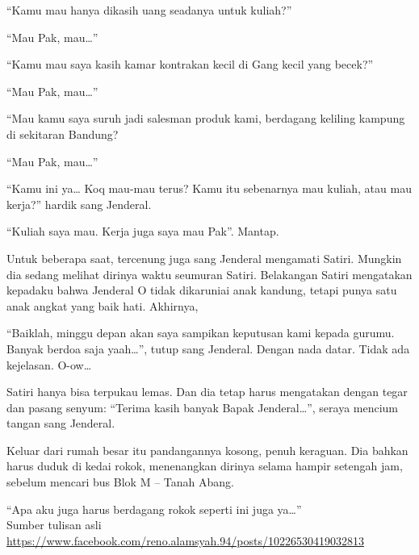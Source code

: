 “Kamu mau hanya dikasih uang seadanya untuk kuliah?”

“Mau Pak, mau…”

“Kamu mau saya kasih kamar kontrakan kecil di Gang kecil yang becek?”

“Mau Pak, mau…”

“Mau kamu saya suruh jadi salesman produk kami, berdagang keliling kampung di sekitaran Bandung?

“Mau Pak, mau…”

“Kamu ini ya… Koq mau-mau terus? Kamu itu sebenarnya mau kuliah, atau mau kerja?” hardik sang Jenderal.

“Kuliah saya mau. Kerja juga saya mau Pak”. Mantap.

Untuk beberapa saat, tercenung juga sang Jenderal mengamati Satiri. Mungkin dia sedang melihat dirinya waktu seumuran Satiri. Belakangan Satiri mengatakan kepadaku bahwa Jenderal O tidak dikaruniai anak kandung, tetapi punya satu anak angkat yang baik hati. Akhirnya,

“Baiklah, minggu depan akan saya sampikan keputusan kami kepada gurumu. Banyak berdoa saja yaah…”, tutup sang Jenderal. Dengan nada datar. Tidak ada kejelasan. O-ow…

Satiri hanya bisa terpukau lemas. Dan dia tetap harus mengatakan dengan tegar dan pasang senyum: “Terima kasih banyak Bapak Jenderal…”, seraya mencium tangan sang Jenderal.

Keluar dari rumah besar itu pandangannya kosong, penuh keraguan. Dia bahkan harus duduk di kedai rokok, menenangkan dirinya selama hampir setengah jam, sebelum mencari bus Blok M – Tanah Abang.

“Apa aku juga harus berdagang rokok seperti ini juga ya…”
\\[10pt]

Sumber tulisan asli \url{https://www.facebook.com/reno.alamsyah.94/posts/10226530419032813}

